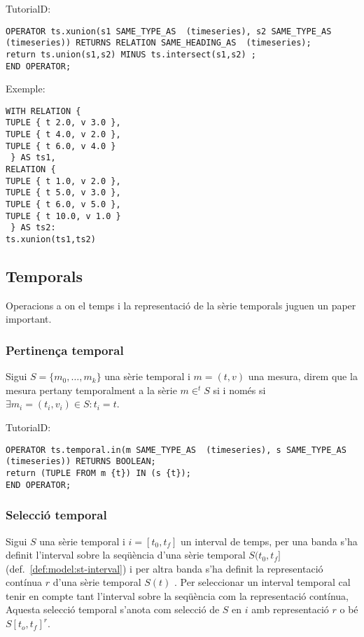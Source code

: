 TutorialD:
\begin{verbatim}
OPERATOR ts.xunion(s1 SAME_TYPE_AS  (timeseries), s2 SAME_TYPE_AS  (timeseries)) RETURNS RELATION SAME_HEADING_AS  (timeseries);
return ts.union(s1,s2) MINUS ts.intersect(s1,s2) ;
END OPERATOR;
\end{verbatim}


Exemple:
\begin{verbatim}
WITH RELATION {
TUPLE { t 2.0, v 3.0 },
TUPLE { t 4.0, v 2.0 },
TUPLE { t 6.0, v 4.0 }
 } AS ts1,
RELATION {
TUPLE { t 1.0, v 2.0 },
TUPLE { t 5.0, v 3.0 },
TUPLE { t 6.0, v 5.0 },
TUPLE { t 10.0, v 1.0 }
 } AS ts2: 
ts.xunion(ts1,ts2)
\end{verbatim}









\subsection{Temporals}

Operacions a on el temps i la representació de la sèrie temporals
juguen un paper important.


\subsubsection{Pertinença temporal}

\begin{definition}
  Sigui $S=\{m_0, \dotsc, m_{k}\}$ una sèrie temporal i $m=(t,v)$ una
  mesura, direm que la mesura pertany temporalment a la sèrie 
  $m\in^t S$ si i només si $\exists m_i=(t_i,v_i)\in S: t_i=t$.
\end{definition}


TutorialD:
\begin{verbatim}
OPERATOR ts.temporal.in(m SAME_TYPE_AS  (timeseries), s SAME_TYPE_AS  (timeseries)) RETURNS BOOLEAN;
return (TUPLE FROM m {t}) IN (s {t});
END OPERATOR;
\end{verbatim}





\subsubsection{Selecció temporal}

Sigui $S$ una sèrie temporal i $i=[t_0,t_f]$ un interval de temps,
per una banda s'ha definit l'interval sobre la seqüència d'una sèrie temporal $S(t_0,t_f]$ (def.~\ref{def:model:st-interval})  i per altra banda s'ha definit la representació contínua $r$ d'una sèrie temporal $S(t)$ .
Per seleccionar un interval temporal cal tenir en compte tant l'interval sobre la seqüència com la representació contínua, Aquesta selecció temporal s'anota com selecció de $S$ en $i$ amb representació $r$ o bé $S[t_o,t_f]^r$. 

